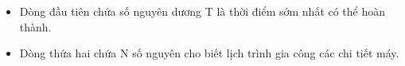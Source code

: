\begin{itemize}
	\item     Dòng đầu tiên chứa số nguyên dương T là thời điểm sớm nhất có thể hoàn thành.   
	\item     Dòng thứa hai chứa N số nguyên cho biết lịch trình gia công các chi tiết máy.   
\end{itemize}

\